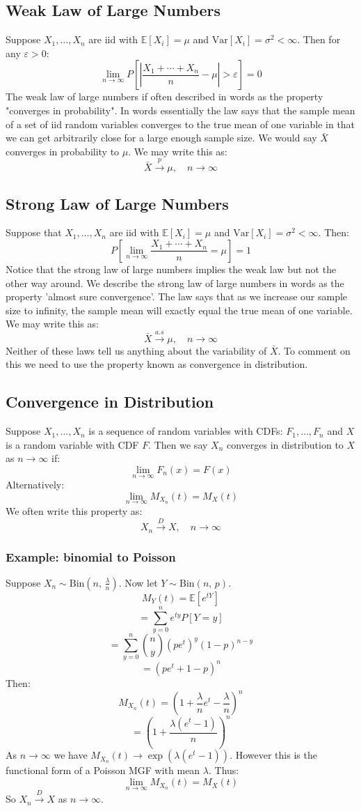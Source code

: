 \documentclass[12pt]{article}
\begin{document}
\subsection{Weak Law of Large Numbers}
Suppose \(X_1,\dots,X_n\) are iid with \(\mathbb{E}[X_i]=\mu\) and \(\text{Var}[X_i]=\sigma^2<\infty\). Then for any \(\varepsilon>0\):
\[\lim_{n\to\infty}P\left[\left|\frac{X_1+\cdots+X_n}{n}-\mu\right|>\varepsilon\right]=0\]
The weak law of large numbers if often described in words as the property "converges in probability". In words essentially the law says that the sample mean of a set of iid random variables converges to the true mean of one variable in that we can get arbitrarily close for a large enough sample size. We would say \(\bar{X}\) converges in probability to \(\mu\). We may write this as:
\[\bar{X}\overset{p}{\to}\mu,\quad n\to\infty\]
\subsection{Strong Law of Large Numbers}
Suppose that \(X_1,\dots,X_n\) are iid with \(\mathbb{E}[X_i]=\mu\) and \(\text{Var}[X_i]=\sigma^2<\infty\). Then:
\[P\left[\lim_{n\to\infty}\frac{X_1+\cdots+X_n}{n}=\mu\right]=1\]
Notice that the strong law of large numbers implies the weak law but not the other way around. We describe the strong law of large numbers in words as the property 'almost sure convergence'. The law says that as we increase our sample size to infinity, the sample mean will exactly equal the true mean of one variable. We may write this as:
\[\bar{X}\overset{a.s}{\to}\mu,\quad n\to\infty\]
Neither of these laws tell us anything about the variability of \(\bar{X}\). To comment on this we need to use the property known as convergence in distribution.
\subsection{Convergence in Distribution}
Suppose \(X_1,\dots,X_n\) is a sequence of random variables with CDFs: \(F_1,\dots,F_n\) and \(X\) is a random variable with CDF \(F\). Then we say \(X_n\) converges in distribution to \(X\) as \(n\to\infty\) if:
\[\lim_{n\to\infty}F_n(x)=F(x)\]
Alternatively:
\[\lim_{n\to\infty}M_{X_n}(t)=M_X(t)\]
We often write this property as:
\[X_n\overset{D}{\to}X,\quad n\to\infty\]
\subsubsection{Example: binomial to Poisson}
Suppose \(X_n\sim\text{Bin}(n,\,\frac{\lambda}{n})\). Now let \(Y\sim\text{Bin}(n,\,p)\).
\[M_Y(t)=\mathbb{E}[e^{tY}]\]
\[=\sum^n_{y=0}e^{ty}P[Y=y]\]
\[=\sum^n_{y=0}\binom{n}{y}(pe^t)^y(1-p)^{n-y}\]
\[=(pe^t+1-p)^n\]
Then:
\[M_{X_n}(t)=\left(1+\frac{\lambda}{n}e^t-\frac{\lambda}{n}\right)^n\]
\[=\left(1+\frac{\lambda(e^t-1)}{n}\right)^n\]
As \(n\to\infty\) we have \(M_{X_n}(t)\to\exp(\lambda(e^t-1))\). However this is the functional form of a Poisson MGF with mean \(\lambda\). Thus:
\[\lim_{n\to\infty}M_{X_n}(t)=M_X(t)\]
So \(X_n\overset{D}{\to}X\) as \(n\to\infty\).
\end{document}
